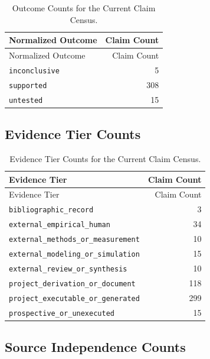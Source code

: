 \documentclass[
  letterpaper,
]{report}
\begin{document}
\begin{longtable}[]{@{}lr@{}}
\caption{Outcome Counts for the Current Claim
Census.}\label{tbl-claim-outcomes}\tabularnewline
\toprule\noalign{}
Normalized Outcome & Claim Count \\
\midrule\noalign{}
\endfirsthead
\toprule\noalign{}
Normalized Outcome & Claim Count \\
\midrule\noalign{}
\endhead
\bottomrule\noalign{}
\endlastfoot
\texttt{inconclusive} & 5 \\
\texttt{supported} & 308 \\
\texttt{untested} & 15 \\
\end{longtable}

\newpage

\subsection{Evidence Tier Counts}\label{evidence-tier-counts}

\begin{longtable}[]{@{}lr@{}}
\caption{Evidence Tier Counts for the Current Claim
Census.}\label{tbl-claim-evidence-tiers}\tabularnewline
\toprule\noalign{}
Evidence Tier & Claim Count \\
\midrule\noalign{}
\endfirsthead
\toprule\noalign{}
Evidence Tier & Claim Count \\
\midrule\noalign{}
\endhead
\bottomrule\noalign{}
\endlastfoot
\texttt{bibliographic\_record} & 3 \\
\texttt{external\_empirical\_human} & 34 \\
\texttt{external\_methods\_or\_measurement} & 10 \\
\texttt{external\_modeling\_or\_simulation} & 15 \\
\texttt{external\_review\_or\_synthesis} & 10 \\
\texttt{project\_derivation\_or\_document} & 118 \\
\texttt{project\_executable\_or\_generated} & 299 \\
\texttt{prospective\_or\_unexecuted} & 15 \\
\end{longtable}

\subsection{Source Independence
Counts}\label{source-independence-counts}
\end{document}
